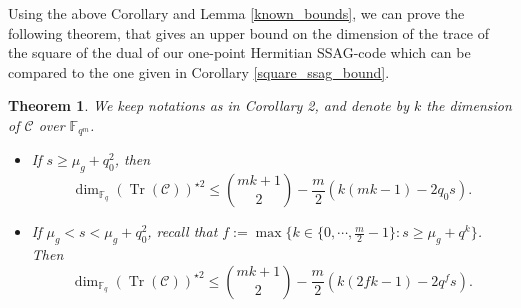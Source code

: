 \documentclass[a4paper]{article}
\newtheorem{thm}{Theorem}
\newcommand{\calC}{\mathcal{C}}
\newcommand{\Tr}{\operatorname{Tr}}
\newcommand{\fqm}{\mathbb{F}_{q^m}}
\newcommand{\fq}{\mathbb{F}_{q}}
\begin{document}
Using the above Corollary and Lemma \ref{known_bounds}, we can prove the following theorem, that gives an upper bound on the dimension of the trace of the square of the dual of our one-point Hermitian SSAG-code which can be compared to the one given in Corollary \ref{square_ssag_bound}.

\begin{thm} \label{sup_bounds_on_codes}
We keep notations as in Corollary 2, and denote by $k$ the dimension of $\calC$ over $\fqm$.
\begin{itemize}
\item[(i)] If $s \geq \mu_g + q_0^2$, then 
\[ \dim_{\fq}(\Tr(\calC))^{\star 2} \leq \binom{mk+1}{2} - \dfrac{m}{2} (k(mk-1)-2q_0s).\]
\item[(ii)] If $\mu_g < s < \mu_g +q_0^2$, recall that $f:= \max\{k \in \{0,\cdots,\frac{m}{2}-1\} : s \geq \mu_g + q^k\}$. Then 
\[ \dim_{\fq}(\Tr(\calC))^{\star 2} \leq \binom{mk+1}{2} - \dfrac{m}{2}(k(2fk-1)-2q^fs).\]
\end{itemize}
\end{thm}
\end{document}
